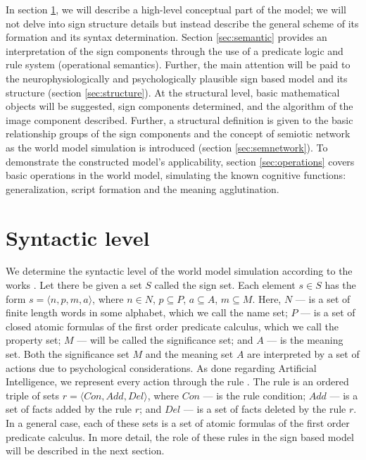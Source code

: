 \documentclass[12pt]{scrartcl}
\begin{document}
	In section \ref{sec:sintaxis}, we will describe a high-level conceptual part of the model; we will not delve into sign structure details but instead describe the general scheme of its formation and its syntax determination. Section \ref{sec:semantic} provides an interpretation of the sign components through the use of a predicate logic and rule system (operational semantics). Further, the main attention will be paid to the neurophysiologically and psychologically plausible sign based model and its structure (section \ref{sec:structure}). At the structural level, basic mathematical objects will be suggested, sign components determined, and the algorithm of the image component described. Further, a structural definition is given to the basic relationship groups of the sign components and the concept of semiotic network as the world model simulation is introduced (section \ref{sec:semnetwork}). To demonstrate the constructed model’s applicability, section \ref{sec:operations} covers basic operations in the world model, simulating the known cognitive functions: generalization, script formation and the meaning agglutination.
	
	
	\section{Syntactic level}\label{sec:sintaxis}

	We determine the syntactic level of the world model simulation according to the works \cite{Osipov2014c,Osipov2015c}. Let there be given a set $S$ called the sign set. Each element $s\in S$ has the form $s=\langle n,p,m,a\rangle$, where $n\in N$, $p\subseteq P$, $a\subseteq A$, $m\subseteq M$. Here, $N$ --- is a set of finite length words in some alphabet, which we call the name set; $P$ --- is a set of closed atomic formulas of the first order predicate calculus, which we call the property set; $M$ --- will be called the significance set; and $A$ --- is the meaning set. Both the significance set $M$ and the meaning set $A$ are interpreted by a set of actions due to psychological considerations. As done regarding Artificial Intelligence, we represent every action through the rule \cite{Osipov2002b}. The rule is an ordered triple of sets $r=\langle Con,Add,Del\rangle$, where $Con$ --- is the rule condition; $Add$ --- is a set of facts added by the rule $r$; and $Del$ --- is a set of facts deleted by the rule $r$. In a general case, each of these sets is a set of atomic formulas of the first order predicate calculus. In more detail, the role of these rules in the sign based model will be described in the next section.
	
\end{document}
